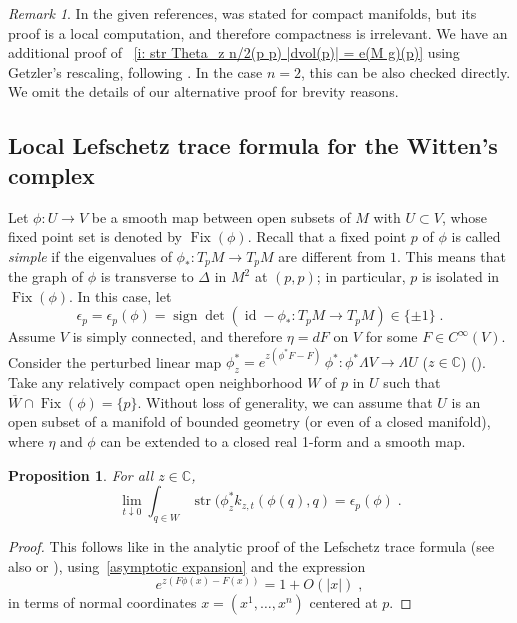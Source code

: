 \documentclass{memo-l}
\theoremstyle{plain}
\newtheorem{prop}[thm]{Proposition}
\theoremstyle{definition}
\theoremstyle{remark}
\newtheorem{rem}[thm]{Remark}
\newcommand{\C}{\mathbb{C}}
\newcommand{\id}{\operatorname{id}}
\newcommand{\sign}{\operatorname{sign}}
\newcommand{\Fix}{\operatorname{Fix}}
\newcommand{\str}{\operatorname{str}}
\numberwithin{section}{chapter}
\numberwithin{equation}{section}%
\begin{document}
\begin{rem}\label{r: e_z l}
In the given references,  was stated for compact manifolds, but its proof is a local computation, and therefore compactness is irrelevant. We have an additional proof of ~\ref{i: str Theta_z n/2(p p) |dvol(p)| = e(M g)(p)} using Getzler's rescaling, following \cite[Section~4.3]{BerlineGetzlerVergne2004}. In the case $n=2$, this can be also checked directly. We omit the details of our alternative proof for brevity reasons.
\end{rem}



\subsection{Local Lefschetz trace formula for the Witten's complex}\label{ss: local Lefschetz formulae}

Let $\phi:U\to V$ be a smooth map between open subsets of $M$ with $U\subset V$, whose fixed point set is denoted by $\Fix(\phi)$. Recall that a fixed point $p$ of $\phi$ is called \emph{simple} if the eigenvalues of $\phi_*:T_pM\to T_pM$ are different from $1$. This means that the graph of $\phi$ is transverse to $\Delta$ in $M^2$ at $(p,p)$; in particular, $p$ is isolated in $\Fix(\phi)$. \index{$\Fix(\phi)$} In this case, let 
\begin{equation}\label{epsilon_p(phi)}
\epsilon_p=\epsilon_p(\phi)=\sign\det(\id-\phi_*:T_pM\to T_pM)\in\{\pm1\}\;.
\end{equation}
Assume $V$ is simply connected, and therefore $\eta=dF$ on $V$ for some $F\in C^\infty(V)$. Consider the perturbed linear map $\phi^*_z=e^{z(\phi^*F-F)}\,\phi^*:\phi^*\Lambda V\to\Lambda U$ ($z\in\C$) (). Take any relatively compact open neighborhood $W$ of $p$ in $U$ such that $\overline W\cap\Fix(\phi)=\{p\}$. Without loss of generality, we can assume that $U$ is an open subset of a manifold of bounded geometry (or even of a closed manifold), where $\eta$ and $\phi$ can be extended to a closed real 1-form and a smooth map.

\begin{prop}\label{p: local Lefschetz formula}
For all $z\in\C$,
\[
\lim_{t\downarrow0}\int_{q\in W}\str(\phi^*_zk_{z,t}(\phi(q),q)=\epsilon_p(\phi)\;.
\]
\end{prop}

\begin{proof}
This follows like in the analytic proof of the Lefschetz trace formula \cite{AtiyahBott1967} (see also \cite[Chapter~10]{Roe1998} or \cite[Section~3.9]{Gilkey1995}), using~\eqref{asymptotic expansion} and the expression
\[
e^{z(F\phi(x)-F(x))}=1+O(|x|)\;,
\]
in terms of normal coordinates $x=(x^1,\dots,x^n)$ centered at $p$.
\end{proof}
\end{document}
